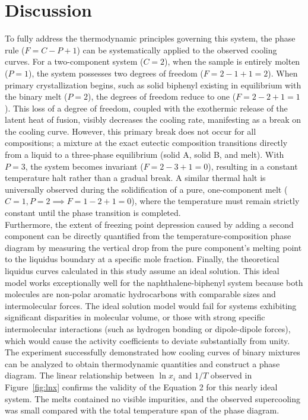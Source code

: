 \documentclass[12pt]{article}
\begin{document}
\section*{Discussion}
To fully address the thermodynamic principles governing this system, the phase rule ($F = C - P + 1$) can be systematically applied to the observed cooling curves. For a two-component system ($C=2$), when the sample is entirely molten ($P=1$), the system possesses two degrees of freedom ($F = 2 - 1 + 1 = 2$). When primary crystallization begins, such as solid biphenyl existing in equilibrium with the binary melt ($P=2$), the degrees of freedom reduce to one ($F = 2 - 2 + 1 = 1$). This loss of a degree of freedom, coupled with the exothermic release of the latent heat of fusion, visibly decreases the cooling rate, manifesting as a break on the cooling curve. However, this primary break does not occur for all compositions; a mixture at the exact eutectic composition transitions directly from a liquid to a three-phase equilibrium (solid A, solid B, and melt). With $P=3$, the system becomes invariant ($F = 2 - 3 + 1 = 0$), resulting in a constant temperature halt rather than a gradual break. A similar thermal halt is universally observed during the solidification of a pure, one-component melt ($C=1, P=2 \implies F = 1 - 2 + 1 = 0$), where the temperature must remain strictly constant until the phase transition is completed. 
\\
Furthermore, the extent of freezing point depression caused by adding a second component can be directly quantified from the temperature-composition phase diagram by measuring the vertical drop from the pure component's melting point to the liquidus boundary at a specific mole fraction.  Finally, the theoretical liquidus curves calculated in this study assume an ideal solution. This ideal model works exceptionally well for the naphthalene-biphenyl system because both molecules are non-polar aromatic hydrocarbons with comparable sizes and intermolecular forces. The ideal solution model would fail for systems exhibiting significant disparities in molecular volume, or those with strong specific intermolecular interactions (such as hydrogen bonding or dipole-dipole forces), which would cause the activity coefficients to deviate substantially from unity.
\\
The experiment successfully demonstrated how cooling curves of binary mixtures can be analyzed to obtain thermodynamic quantities and construct a phase diagram.  The linear relationship between $\ln x_i$ and $1/T$ observed in Figure~\ref{fig:lnx} confirms the validity of the Equation 2 for this nearly ideal system.  The melts contained no visible impurities, and the observed supercooling was small compared with the total temperature span of the phase diagram.
\end{document}
